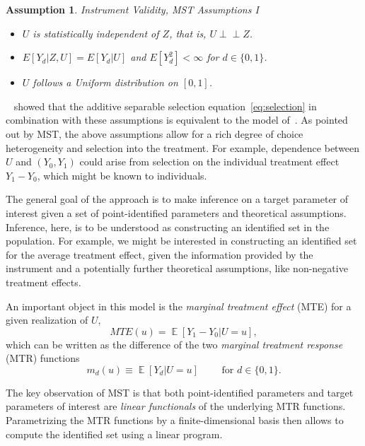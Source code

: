 \documentclass[12pt,a4paper,english]{article} %
\DeclareMathOperator*{\E}{\mathbb{E}}
\newcommand{\indep}{\perp\!\!\!\!\perp}
\numberwithin{equation}{section}
\theoremstyle{definition}
\theoremstyle{remark}
\theoremstyle{plain}
\newtheorem{assumption}{Assumption}
\begin{document}
\begin{assumption}{Instrument Validity, MST Assumptions I}
\begin{itemize}
  \item[1.1] $U$ is statistically independent of $Z$, that is, $U \indep Z$.
  \item[1.2] $E[Y_d|Z,U] = E[Y_d|U]$ and $E[Y_d^2]<\infty$ for $d\in\{0,1\}$.
  \item[1.3] $U$ follows a Uniform distribution on $[0,1]$.
\end{itemize}
\end{assumption}
~\cite{vytlacil2002independence} showed that the additive separable selection equation~\ref{eq:selection} in combination with these assumptions is equivalent to the model of~\cite{imbens_angrist1994ecma}.
As pointed out by MST, the above assumptions allow for a rich degree of choice heterogeneity and selection into the treatment.
For example, dependence between $U$ and $(Y_0, Y_1)$ could arise from selection on the individual treatment effect $Y_1-Y_0$, which might be known to individuals.

The general goal of the approach is to make inference on a target parameter of interest given a set of point-identified parameters and theoretical assumptions.
Inference, here, is to be understood as constructing an identified set in the population.
For example, we might be interested in constructing an identified set for the average treatment effect, given the information provided by the instrument and a potentially further theoretical assumptions, like non-negative treatment effects.

An important object in this model is the \textit{marginal treatment effect} (MTE) for a given realization of $U$,
\begin{equation}\label{eq:mte}
  MTE(u) = \E[Y_1 - Y_0|U=u],
\end{equation}
which can be written as the difference of the two \textit{marginal treatment response} (MTR) functions
\begin{equation}\label{eq:mtr}
  m_d(u) \equiv \E[Y_d|U=u] \qquad \text{ for } d\in\{0,1\}.
\end{equation}

The key observation of MST is that both point-identified parameters and target parameters of interest are \textit{linear functionals} of the underlying MTR functions.
Parametrizing the MTR functions by a finite-dimensional basis then allows to compute the identified set using a linear program.
\end{document}
